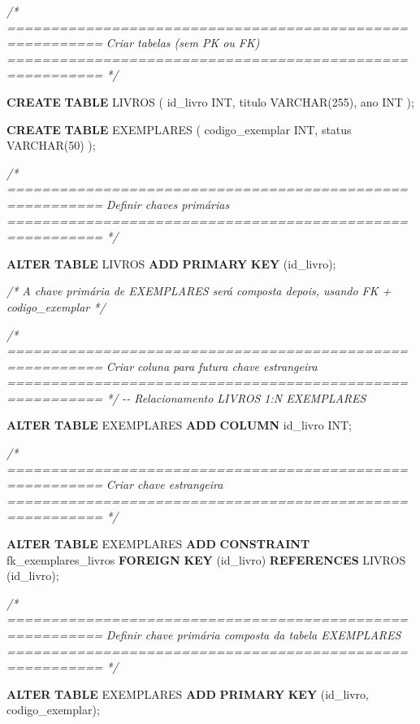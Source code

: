 \documentclass[
]{book}
\newenvironment{Shaded}{\begin{snugshade}}{\end{snugshade}}
\newcommand{\CommentTok}[1]{\textcolor[rgb]{0.56,0.35,0.01}{\textit{#1}}}
\newcommand{\DataTypeTok}[1]{\textcolor[rgb]{0.13,0.29,0.53}{#1}}
\newcommand{\DecValTok}[1]{\textcolor[rgb]{0.00,0.00,0.81}{#1}}
\newcommand{\KeywordTok}[1]{\textcolor[rgb]{0.13,0.29,0.53}{\textbf{#1}}}
\newcommand{\NormalTok}[1]{#1}
\begin{document}
\begin{Shaded}
\begin{Highlighting}[]
\CommentTok{/* =========================================================}
\CommentTok{   Criar tabelas (sem PK ou FK)}
\CommentTok{   ========================================================= */}

\KeywordTok{CREATE} \KeywordTok{TABLE}\NormalTok{ LIVROS }
\NormalTok{(}
\NormalTok{    id\_livro }\DataTypeTok{INT}\NormalTok{,}
\NormalTok{    titulo }\DataTypeTok{VARCHAR}\NormalTok{(}\DecValTok{255}\NormalTok{),}
\NormalTok{    ano }\DataTypeTok{INT}
\NormalTok{);}

\KeywordTok{CREATE} \KeywordTok{TABLE}\NormalTok{ EXEMPLARES }
\NormalTok{(}
\NormalTok{    codigo\_exemplar }\DataTypeTok{INT}\NormalTok{,}
\NormalTok{    status }\DataTypeTok{VARCHAR}\NormalTok{(}\DecValTok{50}\NormalTok{)}
\NormalTok{);}

\CommentTok{/* =========================================================}
\CommentTok{   Definir chaves primárias}
\CommentTok{   ========================================================= */}

\KeywordTok{ALTER} \KeywordTok{TABLE}\NormalTok{ LIVROS }\KeywordTok{ADD} \KeywordTok{PRIMARY} \KeywordTok{KEY}\NormalTok{ (id\_livro);}

\CommentTok{/* A chave primária de EXEMPLARES será composta depois, usando FK + codigo\_exemplar */}

\CommentTok{/* =========================================================}
\CommentTok{   Criar coluna para futura chave estrangeira}
\CommentTok{   ========================================================= */}
\CommentTok{{-}{-} Relacionamento LIVROS 1:N EXEMPLARES}

\KeywordTok{ALTER} \KeywordTok{TABLE}\NormalTok{ EXEMPLARES }\KeywordTok{ADD} \KeywordTok{COLUMN}\NormalTok{ id\_livro }\DataTypeTok{INT}\NormalTok{;}

\CommentTok{/* =========================================================}
\CommentTok{   Criar chave estrangeira}
\CommentTok{   ========================================================= */}

\KeywordTok{ALTER} \KeywordTok{TABLE}\NormalTok{ EXEMPLARES }\KeywordTok{ADD} \KeywordTok{CONSTRAINT}\NormalTok{ fk\_exemplares\_livros }\KeywordTok{FOREIGN} \KeywordTok{KEY}\NormalTok{ (id\_livro) }\KeywordTok{REFERENCES}\NormalTok{ LIVROS (id\_livro);}

\CommentTok{/* =========================================================}
\CommentTok{   Definir chave primária composta da tabela EXEMPLARES}
\CommentTok{   ========================================================= */}

\KeywordTok{ALTER} \KeywordTok{TABLE}\NormalTok{ EXEMPLARES }\KeywordTok{ADD} \KeywordTok{PRIMARY} \KeywordTok{KEY}\NormalTok{ (id\_livro, codigo\_exemplar);}

\end{Highlighting}
\end{Shaded}
\end{document}
